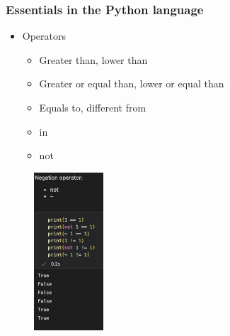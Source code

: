 \begin{frame}\frametitle{Essentials in the Python language}
   \begin{minipage}{0.48\linewidth}
      \begin{itemize}
         \item Operators
         \begin{itemize}
            \item Greater than, lower than
            \item Greater or equal than, lower or equal than
            \item Equals to, different from
            \item in
            \item not
         \end{itemize}
      \end{itemize}
   \end{minipage}
   \begin{minipage}{0.48\linewidth}
      \begin{figure}[H]
         \includegraphics[width=2.6cm]{../images/illustrations/not.jpg}
      \end{figure}
   \end{minipage}
\end{frame}

